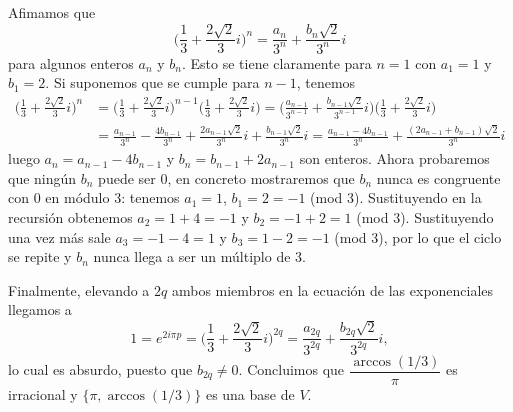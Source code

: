 \documentclass{amsart}
\begin{document}
Afimamos que 
\[\Big(\frac{1}{3}+\frac{2\sqrt{2}}{3}i\Big)^n=\frac{a_n}{3^{n}}+\frac{b_n\sqrt{2}}{3^{n}}i\]
para algunos enteros $a_n$ y $b_n$. Esto se tiene claramente para $n=1$ con $a_1=1$ y $b_1=2$. Si suponemos que se cumple para $n-1$, tenemos
\begin{align*}
\Big(\frac{1}{3}+\frac{2\sqrt{2}}{3}i\Big)^n&=\Big(\frac{1}{3}+\frac{2\sqrt{2}}{3}i\Big)^{n-1}\Big(\frac{1}{3}+\frac{2\sqrt{2}}{3}i\Big)=\Big(\frac{a_{n-1}}{3^{n-1}}+\frac{b_{n-1}\sqrt{2}}{3^{n-1}}i\Big)\Big(\frac{1}{3}+\frac{2\sqrt{2}}{3}i\Big) \\&=\frac{a_{n-1}}{3^n}-\frac{4b_{n-1}}{3^n}+\frac{2a_{n-1}\sqrt{2}}{3^n}i+\frac{b_{n-1}\sqrt{2}}{3^n}i=\frac{a_{n-1}-4b_{n-1}}{3^n}+\frac{(2a_{n-1}+b_{n-1})\sqrt{2}}{3^n}i
\end{align*}
luego $a_n=a_{n-1}-4b_{n-1}$ y $b_n=b_{n-1}+2a_{n-1}$ son enteros. Ahora probaremos que ningún $b_n$ puede ser 0, en concreto mostraremos que $b_n$ nunca es congruente con 0 en módulo 3: tenemos $a_1=1$, $b_1=2=-1$ (mod 3). Sustituyendo en la recursión obtenemos $a_2=1+4=-1$ y $b_2=-1+2=1$ (mod 3). Sustituyendo una vez más sale $a_3=-1-4=1$ y $b_3=1-2=-1$ (mod 3), por lo que el ciclo se repite y $b_n$ nunca llega a ser un múltiplo de 3.

Finalmente, elevando a $2q$ ambos miembros en la ecuación de las exponenciales llegamos a
\[1=e^{2i\pi p}=\Big(\frac{1}{3}+\frac{2\sqrt{2}}{3}i\Big)^{2q}=\frac{a_{2q}}{3^{2q}}+\frac{b_{2q}\sqrt{2}}{3^{2q}}i,\]
lo cual es absurdo, puesto que $b_{2q}\neq 0$. Concluimos que $\dfrac{\arccos{(1/3)}}{\pi}$ es irracional y $\{\pi,\arccos{(1/3)}\}$ es una base de $V$.
\end{document}
